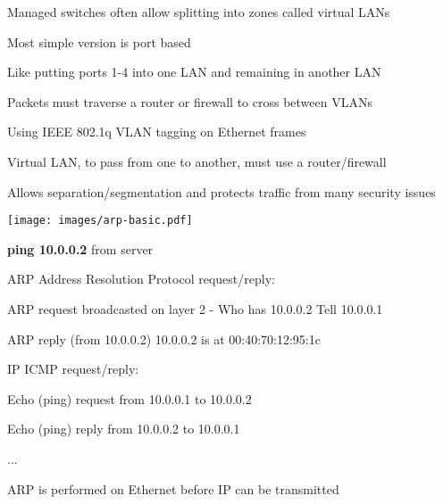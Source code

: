 \documentclass[Screen16to9,17pt]{foils}
\begin{document}
\begin{list1}
\item Managed switches often allow splitting into zones called virtual LANs
\item Most simple version is port based
\item Like putting ports 1-4 into one LAN and remaining in another LAN
\item Packets must traverse a router or firewall to cross between VLANs
\end{list1}



\begin{list1}
\item Using IEEE 802.1q  VLAN tagging on Ethernet frames
\item Virtual LAN, to pass from one to another, must use a router/firewall
\item Allows separation/segmentation and protects traffic from many security issues
\end{list1}



\begin{center}
\colorbox{white}{\texttt{[image: images/arp-basic.pdf]}}
\end{center}



\begin{list1}
\item {\bfseries ping 10.0.0.2} from server
\item ARP Address Resolution Protocol request/reply:
  \begin{list2}
  \item ARP request broadcasted on layer 2 - Who has 10.0.0.2 Tell 10.0.0.1
  \item ARP reply (from 10.0.0.2) 10.0.0.2 is at 00:40:70:12:95:1c
  \end{list2}
\item IP ICMP request/reply:
  \begin{list2}
    \item Echo (ping) request from 10.0.0.1 to 10.0.0.2
\item Echo (ping) reply from 10.0.0.2 to 10.0.0.1
\item ...
  \end{list2}
\item ARP is performed on Ethernet before IP can be transmitted
\end{list1}
\end{document}
